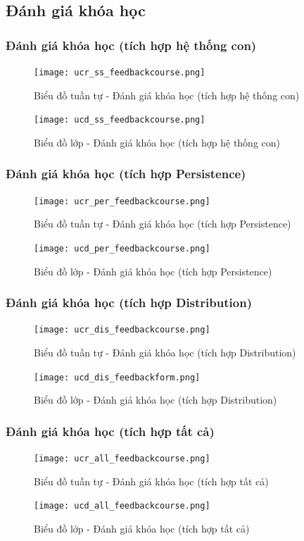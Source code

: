 \documentclass[./../main.tex]{subfiles}
\begin{document}
\subsection{Đánh giá khóa học}
\subsubsection{Đánh giá khóa học (tích hợp hệ thống con)}
\begin{figure}[H]
    \centering
    \texttt{[image: ucr\_ss\_feedbackcourse.png]}
    \caption{Biểu đồ tuần tự - Đánh giá khóa học (tích hợp hệ thống con)}
\end{figure}
\begin{figure}[H]
    \centering
    \texttt{[image: ucd\_ss\_feedbackcourse.png]}
    \caption{Biểu đồ lớp - Đánh giá khóa học (tích hợp hệ thống con)}
\end{figure}
\subsubsection{Đánh giá khóa học (tích hợp Persistence)}
\begin{figure}[H]
    \centering
    \texttt{[image: ucr\_per\_feedbackcourse.png]}
    \caption{Biểu đồ tuần tự - Đánh giá khóa học (tích hợp Persistence)}
\end{figure}
\begin{figure}[H]
    \centering
    \texttt{[image: ucd\_per\_feedbackcourse.png]}
    \caption{Biểu đồ lớp - Đánh giá khóa học (tích hợp Persistence)}
\end{figure}
\subsubsection{Đánh giá khóa học (tích hợp Distribution)}
\begin{figure}[H]
    \centering
    \texttt{[image: ucr\_dis\_feedbackcourse.png]}
    \caption{Biểu đồ tuần tự - Đánh giá khóa học (tích hợp Distribution)}
\end{figure}
\begin{figure}[H]
    \centering
    \texttt{[image: ucd\_dis\_feedbackform.png]}
    \caption{Biểu đồ lớp - Đánh giá khóa học (tích hợp Distribution)}
\end{figure}
\subsubsection{Đánh giá khóa học (tích hợp tất cả)}
\begin{figure}[H]
    \centering
    \texttt{[image: ucr\_all\_feedbackcourse.png]}
    \caption{Biểu đồ tuần tự - Đánh giá khóa học (tích hợp tất cả)}
\end{figure}
\begin{figure}[H]
    \centering
    \texttt{[image: ucd\_all\_feedbackcourse.png]}
    \caption{Biểu đồ lớp - Đánh giá khóa học (tích hợp tất cả)}
\end{figure}
\end{document}
